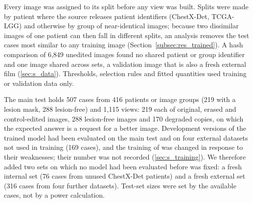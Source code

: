 Every image was assigned to its split before any view was built. Splits were made by patient where the source releases patient identifiers (ChestX-Det, TCGA-LGG) and otherwise by group of near-identical images; because two dissimilar images of one patient can then fall in different splits, an analysis removes the test cases most similar to any training image (Section~\ref{subsec:res_trained}). A hash comparison of 6,849 unedited images found no shared patient or group identifier and one image shared across sets, a validation image that is also a fresh external film (\ref{sec:s_data}). Thresholds, selection rules and fitted quantities used training or validation data only.

The main test holds 507 cases from 416 patients or image groups (219 with a lesion mask, 288 lesion-free) and 1,115 views: 219 each of original, erased and control-edited images, 288 lesion-free images and 170 degraded copies, on which the expected answer is a request for a better image. Development versions of the trained model had been evaluated on the main test and on four external datasets not used in training (169 cases), and the training of \ms{} was changed in response to their weaknesses; their number was not recorded (\ref{sec:s_training}). We therefore added two sets on which no model had been evaluated before \ms{} was fixed: a fresh internal set (76 cases from unused ChestX-Det patients) and a fresh external set (316 cases from four further datasets). Test-set sizes were set by the available cases, not by a power calculation.

